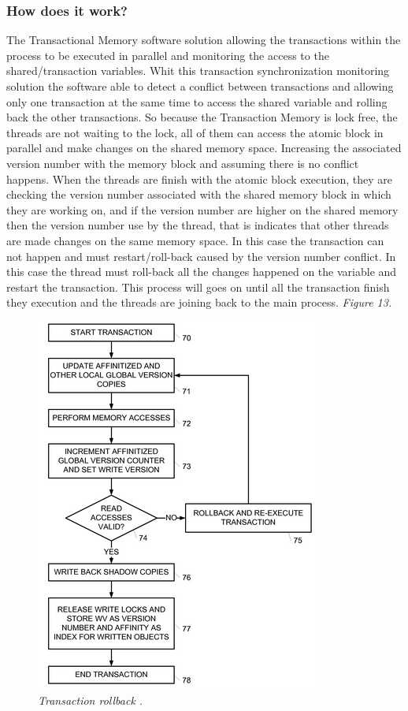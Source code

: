 \documentclass[12pt]{article}
\begin{document}
\subsubsection{How does it work?}
The Transactional Memory software solution allowing the transactions within the process to be executed in parallel and monitoring the access to the shared/transaction variables. Whit this transaction synchronization monitoring solution the software able to detect a conflict between transactions and allowing only one transaction at the same time to access the shared variable and rolling back the other transactions. So because the  Transaction Memory is lock free, the threads are not waiting to the lock, all of them can access the atomic block in parallel and make changes on the shared memory space. Increasing the associated version number with the memory block and assuming there is no conflict happens. When the threads are finish with the atomic block execution, they are checking the version number associated with the shared memory block in which they are working on, and if the version number are higher on the shared memory then the version number use by the thread, that is indicates that other threads are made changes on the same memory space. In this case the transaction can not happen and must restart/roll-back caused by the version number conflict. In this case the thread must roll-back all the changes happened on the variable and restart the transaction. This process will goes on until all the transaction finish they execution and the threads are joining back to the main process. \cite{Stack}\textit{\color{gray}Figure 13.}\\

\begin{figure}[h!]
\centering
\includegraphics[scale=0.3]{Pictures/rollback.png}
\caption{\textit{\color{gray}Transaction rollback \cite{Patent}.}}
\end{figure}
\end{document}
